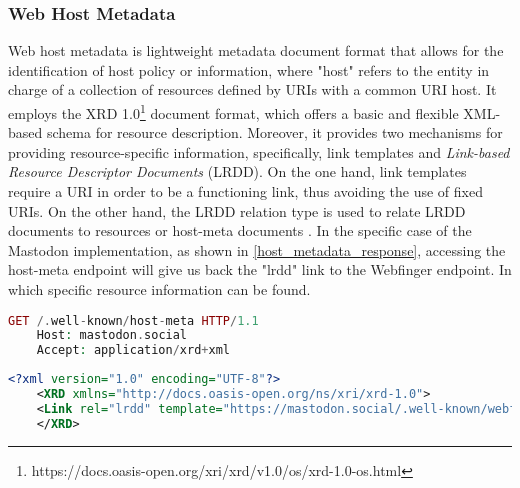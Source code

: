 \subsubsection{Web Host Metadata}
    Web host metadata is lightweight metadata document format that allows for the identification of host policy or information, where "host" refers to the entity in charge of a collection of resources defined by URIs with a common URI host. It employs the XRD 1.0\footnote{https://docs.oasis-open.org/xri/xrd/v1.0/os/xrd-1.0-os.html} document format, which offers a basic and flexible XML-based schema for resource description. Moreover,  it provides two mechanisms for providing resource-specific information, specifically,  link templates and \emph{Link-based Resource Descriptor Documents} (LRDD). On the one hand, link templates require a URI in order to be a functioning link, thus avoiding the use of fixed URIs. On the other hand, the LRDD relation type is used to relate LRDD documents to resources or host-meta documents \cite{cook_2011}. In the specific case of the Mastodon implementation, as shown in \ref{host_metadata_response}, accessing the host-meta endpoint will give us back the "lrdd" link to the Webfinger endpoint. In which specific resource information can be found. 

\lstset{style=JSONStyle}
\begin{lstlisting}[language=PHP, caption=Host Medata request, label="Host Metadata request]
    GET /.well-known/host-meta HTTP/1.1
    Host: mastodon.social
    Accept: application/xrd+xml
\end{lstlisting}

\lstset{style=JSONStyle}
\begin{lstlisting}[language=XML, caption=Host metadata response from mastodon.social, label=host_metadata_response]
    <?xml version="1.0" encoding="UTF-8"?>
    <XRD xmlns="http://docs.oasis-open.org/ns/xri/xrd-1.0">
    <Link rel="lrdd" template="https://mastodon.social/.well-known/webfinger?resource={uri}"/>
    </XRD>
\end{lstlisting}

